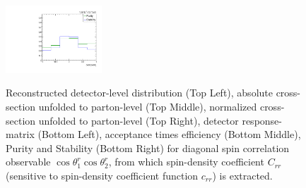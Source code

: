 \begin{figure}[htb]
\begin{center}
 \includegraphics[width=0.32\textwidth]{fig_fullRun2UL/unfolding/combined/PurStab_c_rr.pdf} \\
\caption{Reconstructed detector-level distribution (Top Left), absolute cross-section unfolded to parton-level (Top Middle), normalized cross-section unfolded to parton-level (Top Right), detector response-matrix (Bottom Left), acceptance times efficiency (Bottom Middle), Purity and Stability (Bottom Right) for diagonal spin correlation observable $\cos\theta_{1}^{r}\cos\theta_{2}^{r}$, from which spin-density coefficient $C_{rr}$ (sensitive to spin-density coefficient function $c_{r r}$) is extracted.}
\label{fig:c_rr}
\end{center}
\end{figure}
\clearpage
